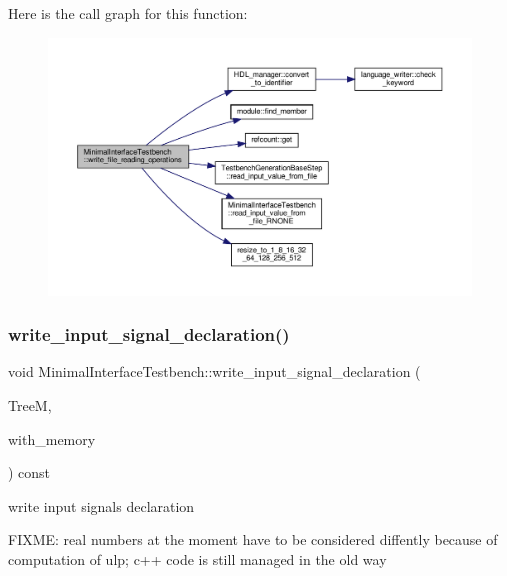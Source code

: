 Here is the call graph for this function\+:
\nopagebreak
\begin{figure}[H]
\begin{center}
\leavevmode
\includegraphics[width=350pt]{d0/dba/classMinimalInterfaceTestbench_a017c01898d65736dccd9531a81151283_cgraph}
\end{center}
\end{figure}
\mbox{\label{classMinimalInterfaceTestbench_ad98da27cdbef628638bae4f61ce36cc7}} 
\subsubsection{\texorpdfstring{write\+\_\+input\+\_\+signal\+\_\+declaration()}{write\_input\_signal\_declaration()}}
{\footnotesize\ttfamily void Minimal\+Interface\+Testbench\+::write\+\_\+input\+\_\+signal\+\_\+declaration (\begin{DoxyParamCaption}\item[{const \hyperlink{tree__manager_8hpp_a792e3f1f892d7d997a8d8a4a12e39346}{tree\+\_\+manager\+Const\+Ref}}]{TreeM,  }\item[{bool \&}]{with\+\_\+memory }\end{DoxyParamCaption}) const\hspace{0.3cm}{\ttfamily [protected]}}

write input signals declaration

F\+I\+X\+ME\+: real numbers at the moment have to be considered diffently because of computation of ulp; c++ code is still managed in the old way 

